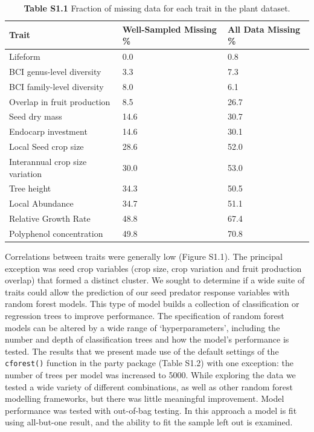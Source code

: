 \documentclass[11pt]{article}
\begin{document}
\begin{table}[]
\small
\begin{tabular}{@{}lll@{}}
\toprule
Trait                           & Well-Sampled Missing \% & All Data Missing \% \\ \midrule
Lifeform                        & 0.0                     & 0.8                 \\
BCI genus-level diversity       & 3.3                     & 7.3                 \\
BCI family-level diversity      & 8.0                     & 6.1                 \\
Overlap in fruit production     & 8.5                     & 26.7                \\
Seed dry mass                   & 14.6                    & 30.7                \\
Endocarp investment             & 14.6                    & 30.1                \\
Local Seed crop size            & 28.6                    & 52.0                \\
Interannual crop size variation & 30.0                    & 53.0                \\
Tree height                     & 34.3                    & 50.5                \\
Local Abundance                 & 34.7                    & 51.1                \\
Relative Growth Rate            & 48.8                    & 67.4                \\
Polyphenol concentration        & 49.8                    & 70.8                \\ \bottomrule
\end{tabular}
\caption{\textbf{Table S1.1} Fraction of missing data for each trait in the plant dataset. }
\label{tab:my-table}
\end{table}

Correlations between traits were generally low (Figure S1.1). The principal exception was seed crop variables (crop size, crop variation and fruit production overlap) that formed a distinct cluster. 
We sought to determine if a wide suite of traits could allow the prediction of our seed predator response variables with random forest models. This type of model builds a collection of classification or regression trees to improve performance. The specification of random forest models can be altered by a wide range of ‘hyperparameters’, including the number and depth of classification trees and how the model’s performance is tested. The results that we present made use of the default settings of the \texttt{cforest()} function in the party package (Table S1.2) with one exception: the number of trees per model was increased to 5000. While exploring the data we tested a wide variety of different combinations, as well as other random forest modelling frameworks, but there was little meaningful improvement. Model performance was tested with out-of-bag testing. In this approach a model is fit using all-but-one result, and the ability to fit the sample left out is examined.
\end{document}
